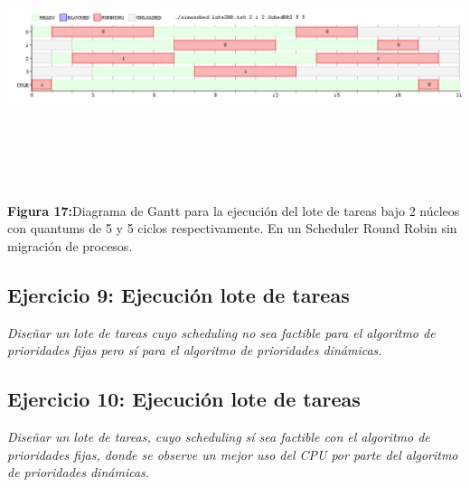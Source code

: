 \documentclass[a4paper]{article}
\begin{document}
\includegraphics[width=\textwidth,height=3.0in,keepaspectratio
]{imagenes/ej8/2eje6.png} \\
\begin {flushleft}
\textbf{Figura 17:}Diagrama de Gantt para la ejecuci\'on del lote de tareas bajo 2 n\'ucleos con quantums de 5 y 5 ciclos respectivamente. En un Scheduler Round Robin sin migración de procesos.
\end{flushleft}	
 
\newpage
 \subsection{Ejercicio 9:  Ejecuci\'on lote de tareas}
\textit{Dise\~nar un lote de tareas cuyo scheduling no sea factible para el algoritmo de prioridades fijas pero s\'i para el algoritmo de prioridades din\'amicas.}
\newpage
 \subsection{Ejercicio 10:  Ejecuci\'on lote de tareas}
\textit{Dise\~nar un lote de tareas, cuyo scheduling s\'i sea factible con el algoritmo de prioridades fijas, donde se observe un mejor uso del CPU por parte del algoritmo de prioridades din\'amicas.}
\end{document}
